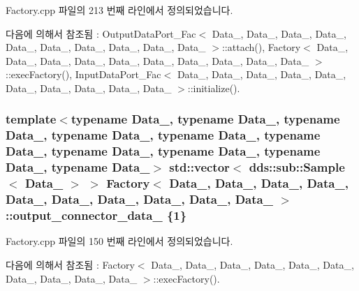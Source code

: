 Factory.\+cpp 파일의 213 번째 라인에서 정의되었습니다.



다음에 의해서 참조됨 \+:  Output\+Data\+Port\+\_\+\+Fac$<$ Data\+\_, Data\+\_, Data\+\_, Data\+\_, Data\+\_, Data\+\_, Data\+\_, Data\+\_, Data\+\_, Data\+\_ $>$\+::attach(), Factory$<$ Data\+\_, Data\+\_, Data\+\_, Data\+\_, Data\+\_, Data\+\_, Data\+\_, Data\+\_, Data\+\_, Data\+\_ $>$\+::exec\+Factory(), Input\+Data\+Port\+\_\+\+Fac$<$ Data\+\_, Data\+\_, Data\+\_, Data\+\_, Data\+\_, Data\+\_, Data\+\_, Data\+\_, Data\+\_, Data\+\_ $>$\+::initialize().

\subsubsection[{\texorpdfstring{output\+\_\+connector\+\_\+data\+\_\+1}{output_connector_data_1}}]{\setlength{\rightskip}{0pt plus 5cm}template$<$typename Data\+\_, typename Data\+\_, typename Data\+\_, typename Data\+\_, typename Data\+\_, typename Data\+\_, typename Data\+\_, typename Data\+\_, typename Data\+\_, typename Data\+\_$>$ std\+::vector$<$ dds\+::sub\+::\+Sample$<$ Data\+\_ $>$ $>$ {\bf Factory}$<$ Data\+\_, Data\+\_, Data\+\_, Data\+\_, Data\+\_, Data\+\_, Data\+\_, Data\+\_, Data\+\_, Data\+\_ $>$\+::output\+\_\+connector\+\_\+data\+\_ \{1\}}\hypertarget{classFactory_a5b0446916aba039e366098c8db768b72}{}\label{classFactory_a5b0446916aba039e366098c8db768b72}


Factory.\+cpp 파일의 150 번째 라인에서 정의되었습니다.



다음에 의해서 참조됨 \+:  Factory$<$ Data\+\_, Data\+\_, Data\+\_, Data\+\_, Data\+\_, Data\+\_, Data\+\_, Data\+\_, Data\+\_, Data\+\_ $>$\+::exec\+Factory().

